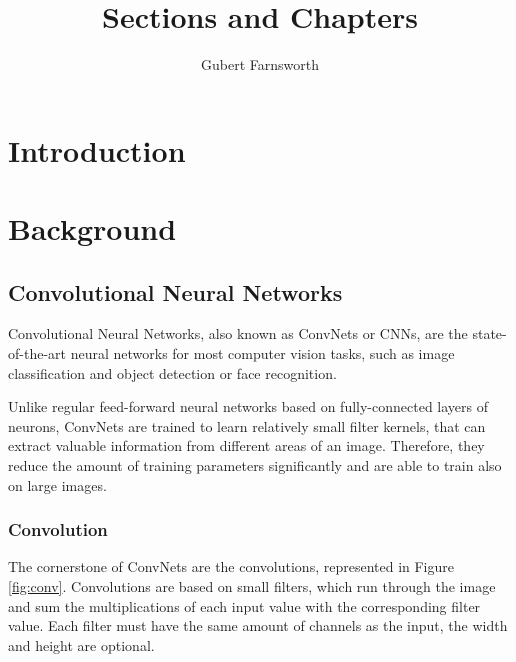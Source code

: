 \documentclass{article}
\title{Sections and Chapters}
\author{Gubert Farnsworth}
\date{ }
\begin{document}
\maketitle
\tableofcontents

\newpage

\section{Introduction}

\section{Background}


\subsection{Convolutional Neural Networks}
Convolutional Neural Networks, also known as ConvNets or CNNs, are the state-of-the-art neural networks for most computer vision tasks, such as image classification and object detection or face recognition.

Unlike regular feed-forward neural networks based on fully-connected layers of neurons, ConvNets are trained to learn relatively small filter kernels, that can extract valuable information from different areas of an image. Therefore, they reduce the amount of training parameters significantly and are able to train also on large images.

\subsubsection{Convolution}
The cornerstone of ConvNets are the convolutions, represented in Figure \ref{fig:conv}. Convolutions are based on small filters, which run through the image and sum the multiplications of each input value with the corresponding filter value. Each filter must have the same amount of channels as the input, the width and height are optional. 
\end{document}

